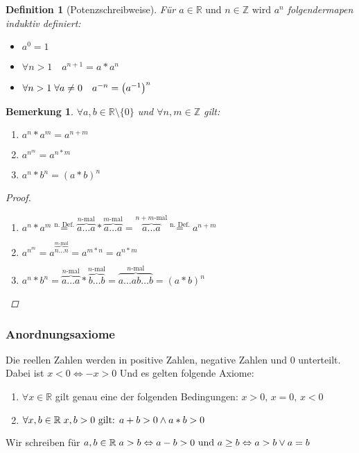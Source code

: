 \documentclass[a4paper,titlepage,oneside]{article}
\def\Z{\ensuremath{\mathbb{Z}} }
\def\R{\ensuremath{\mathbb{R}} }
\def\fa{\ensuremath{\forall}}
\def\lor{\ensuremath{\vee}}
\def\land{\ensuremath{\wedge}}
\def\sp{\hspace{0,1cm}}
\theoremstyle{thmstyle}
\newtheorem{defi}[satz]{Definition}
\newtheorem{bem}[satz]{Bemerkung}
\begin{document}
\begin{defi}[Potenzschreibweise]
Für \(a \in \R \text{ und }n \in \Z \text{ wird }a^n\) folgendermapen induktiv definiert:
\begin{itemize}
	\item \(a^0 = 1\)
	\item \(\fa n > 1 \quad a^{n+1} = a * a^n \)
	\item \(\fa n > 1 \sp \fa a \ne 0 \quad a^{-n} = \left(a^{-1}\right)^n\)
\end{itemize}
\end{defi}
\newpage

\begin{bem}
\(\fa a, b \in \R \setminus \{0\} \) und \( \fa n, m \in \Z\) gilt:
\begin{enumerate}[label=(\arabic*)]
	\item $\displaystyle a^n * a^m = a^{n+m} $
	\item $\displaystyle a^{n^m} = a^{n * m} $
	\item $\displaystyle a^n * b^n = (a * b)^n $
\end{enumerate}
\begin{proof}\sp
\begin{enumerate}[label=(\arabic*)]
	\item $\displaystyle a^n * a^m \overset{\text{n. Def.}}{=} \overbrace{a \dots a}^{n\text{-mal}}*\overbrace{a \dots a}^{m\text{-mal}} = \overbrace{a \dots a}^{n+m\text{-mal}} \overset{\text{n. Def.}}{=} a^{n+m}$
	\item $\displaystyle a^{n^m} = a^{\overbrace{n \dots n}^{m\text{-mal}}} = a^{m * n} = a^{n*m}$
	\item $\displaystyle a^n * b^n = \overbrace{a \dots a}^{n\text{-mal}}*\overbrace{b \dots b}^{n\text{-mal}} = \overbrace{a \dots a b \dots b}^{n\text{-mal}} = (a*b)^{n}$
\end{enumerate}
\end{proof}
\end{bem}

\subsubsection{Anordnungsaxiome}
Die reellen Zahlen werden in positive Zahlen, negative Zahlen und 0 unterteilt. Dabei ist \(x < 0 \Leftrightarrow -x > 0\) Und es gelten folgende Axiome:
\begin{enumerate}[label=(\arabic*)]
	\item \(\fa x \in \R \) gilt genau eine der folgenden Bedingungen: \(x > 0\text{, } x = 0\text{, } x < 0 \)
	\item \(\fa x,b \in \R \sp x,b > 0 \text{ gilt: } a + b > 0 \land a * b > 0\)
\end{enumerate}
Wir schreiben für \(a, b \in \R \sp a > b \Leftrightarrow a - b > 0\text{ und }a \ge b \Leftrightarrow a > b \lor a = b \)
\end{document}
